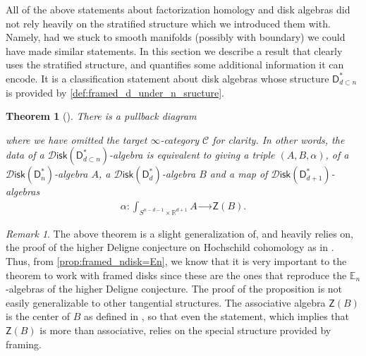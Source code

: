 \documentclass[12pt,a4paper]{article}
\newcounter{counter} \numberwithin{counter}{section}
\theoremstyle{definition}
\theoremstyle{plain}
\newtheorem{theorem}[counter]{Theorem}
\theoremstyle{remark}
\newtheorem{remark}[counter]{Remark}
\newcommand{\catC}{\mathscr{C}}
\newcommand{\disk}{\mathscr{D} \mathsf{isk}}
\newcommand{\alg}[1]{\mathscr{A} \mathsf{lg}_{#1}}
\begin{document}
All of the above statements about factorization homology and disk algebras did not rely heavily on the stratified structure which we introduced them with. Namely, had we stuck to smooth manifolds (possibly with boundary) we could have made similar statements. In this section we describe a result that clearly uses the stratified structure, and quantifies some additional information it can encode. It is a classification statement about disk algebras whose structure $\mathsf{D}_{d \subset n}^*$ is provided by \cref{def:framed_d_under_n_sructure}.

\begin{theorem}[{\cite[prop.4.8]{aft_fhstrat}}]\label{thm:classif_disk_d_under_n*_alg}
    There is a pullback diagram
    \begin{center}
    \end{center}
    where we have omitted the target $\infty$-category $\catC$ for clarity. In other words, the data of a $\disk(\mathsf{D}_{d \subset n}^*)$-algebra is equivalent to giving a triple $(A, B, \alpha)$, of a $\disk(\mathsf{D}_n^*)$-algebra $A$, a $\disk(\mathsf{D}_d^*)$-algebra $B$ and a map of $\disk(\mathsf{D}_{d+1}^*)$-algebras
    \begin{align}
        \alpha: \int_{S^{n-d-1} \times \mathbb{R}^{d+1}} A \xrightarrow{\ \ \quad} \mathsf{Z} (B).
    \end{align}
\end{theorem}

\begin{remark}
    The above theorem is a slight generalization of, and heavily relies on, the proof of the higher Deligne conjecture on Hochschild cohomology as in \cite[sec.5.3]{lurie_ha}. Thus, from \cref{prop:framed_ndisk=En}, we know that it is very important to the theorem to work with framed disks since these are the ones that reproduce the $\mathbb{E}_n$-algebras of the higher Deligne conjecture. The proof of the proposition is not easily generalizable to other tangential structures. The associative algebra $\mathsf{Z} (B)$ is the center of $B$ as defined in \cite[def.5.3.1.6]{lurie_ha}, so that even the statement, which implies that $\mathsf{Z}(B)$ is more than associative, relies on the special structure provided by framing.  
\end{remark}
\end{document}
